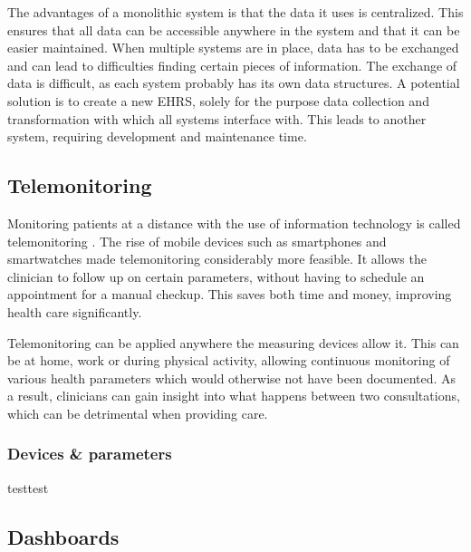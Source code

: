         The advantages of a monolithic system is that the data it uses is centralized. This ensures that all data can be accessible anywhere in the system and that it can be easier maintained. When multiple systems are in place, data has to be exchanged and can lead to difficulties finding certain pieces of information. The exchange of data is difficult, as each system probably has its own data structures. A potential solution is to create a new EHRS, solely for the purpose data collection and transformation with which all systems interface with. This leads to another system, requiring development and maintenance time.
    \subsection{Telemonitoring} \label{2_telemonitoring}
    Monitoring patients at a distance with the use of information technology is called telemonitoring \cite{telemonitoring_definition}. The rise of mobile devices such as smartphones and smartwatches made telemonitoring considerably more feasible. It allows the clinician to follow up on certain parameters, without having to schedule an appointment for a manual checkup. This saves both time and money, improving health care significantly.
    
    Telemonitoring can be applied anywhere the measuring devices allow it. This can be at home, work or during physical activity, allowing continuous monitoring of various health parameters which would otherwise not have been documented. As a result, clinicians can gain insight into what happens between two consultations, which can be detrimental when providing care.
    
        \subsubsection{Devices \& parameters}

        testtest


    

    \subsection{Dashboards} \label{2_dashboards}


